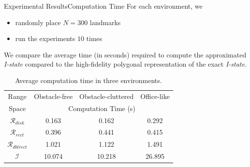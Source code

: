 \documentclass[10pt]{beamer}
\begin{document}
\begin{frame}{Experimental Results}{Computation Time}
  For each environment, we
  \begin{itemize}
  \item randomly place $N = 300$ landmarks 
  \item run the  experiments $10$ times
  \end{itemize} 
  \begin{block}{}
    We compare the average time (in seconds) required to compute the approximated
    \emph{I-state} compared to the high-fidelity polygonal representation of the
    exact \emph{I-state}.
  \end{block}
\begin{table}
  \footnotesize\centering
    \begin{tabular}{cccc} 
    \hline
    Range & Obstacle-free & Obstacle-cluttered & Office-like\\
    Space & \multicolumn{3}{c}{Computation Time (s)}  \\ 
    \hline
    $\mathcal{R}_{disk}$ & 0.163  & 0.162   & 0.292  \\ 
    \hline
    $\mathcal{R}_{rect}$ & 0.396   & 0.441  & 0.415  \\
    \hline
    $\mathcal{R}_{dblrect}$ & 1.021  & 1.122  & 1.491  \\
    \hline
    $\mathcal{I}$ & 10.074  & 10.218  & 26.895  \\
    \hline
    \end{tabular}
    \caption{{Average computation time in three environments.}}
\end{table}
\end{frame}
\end{document}
